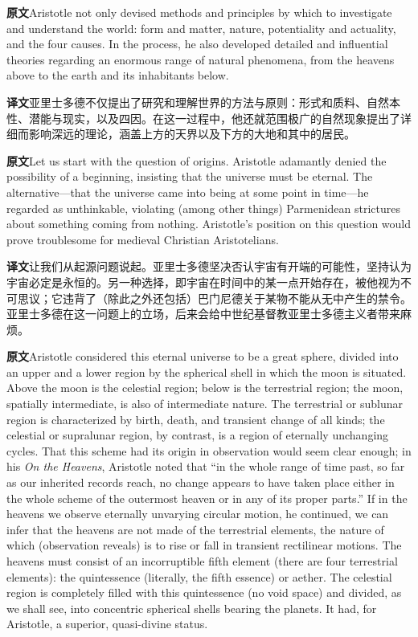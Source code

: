 \documentclass[UTF8,zihao=-4]{ctexart}
\newcommand{\BodyFont}{\fontsize{10.5pt}{15.5pt}\selectfont}
\newcommand{\origlabel}{\textbf{原文}\quad}
\newcommand{\translabel}{\textbf{译文}\quad}
\newcommand{\orig}{\par\noindent\begingroup\BodyFont\origlabel}
\newcommand{\zhline}[1]{\par\endgroup\noindent\begingroup\BodyFont\translabel #1\par\endgroup\vspace{0.35em}}
\begin{document}
\orig Aristotle not only devised methods and principles by which to investigate and understand the world: form and matter, nature, potentiality and actuality, and the four causes. In the process, he also developed detailed and influential theories regarding an enormous range of natural phenomena, from the heavens above to the earth and its inhabitants below.

\zhline{亚里士多德不仅提出了研究和理解世界的方法与原则：形式和质料、自然本性、潜能与现实，以及四因。在这一过程中，他还就范围极广的自然现象提出了详细而影响深远的理论，涵盖上方的天界以及下方的大地和其中的居民。}

\orig Let us start with the question of origins. Aristotle adamantly denied the possibility of a beginning, insisting that the universe must be eternal. The alternative---that the universe came into being at some point in time---he regarded as unthinkable, violating (among other things) Parmenidean strictures about something coming from nothing. Aristotle's position on this question would prove troublesome for medieval Christian Aristotelians.

\zhline{让我们从起源问题说起。亚里士多德坚决否认宇宙有开端的可能性，坚持认为宇宙必定是永恒的。另一种选择，即宇宙在时间中的某一点开始存在，被他视为不可思议；它违背了（除此之外还包括）巴门尼德关于某物不能从无中产生的禁令。亚里士多德在这一问题上的立场，后来会给中世纪基督教亚里士多德主义者带来麻烦。}

\orig Aristotle considered this eternal universe to be a great sphere, divided into an upper and a lower region by the spherical shell in which the moon is situated. Above the moon is the celestial region; below is the terrestrial region; the moon, spatially intermediate, is also of intermediate nature. The terrestrial or sublunar region is characterized by birth, death, and transient change of all kinds; the celestial or supralunar region, by contrast, is a region of eternally unchanging cycles. That this scheme had its origin in observation would seem clear enough; in his \textit{On the Heavens}, Aristotle noted that ``in the whole range of time past, so far as our inherited records reach, no change appears to have taken place either in the whole scheme of the outermost heaven or in any of its proper parts.'' If in the heavens we observe eternally unvarying circular motion, he continued, we can infer that the heavens are not made of the terrestrial elements, the nature of which (observation reveals) is to rise or fall in transient rectilinear motions. The heavens must consist of an incorruptible fifth element (there are four terrestrial elements): the quintessence (literally, the fifth essence) or aether. The celestial region is completely filled with this quintessence (no void space) and divided, as we shall see, into concentric spherical shells bearing the planets. It had, for Aristotle, a superior, quasi-divine status.
\end{document}
